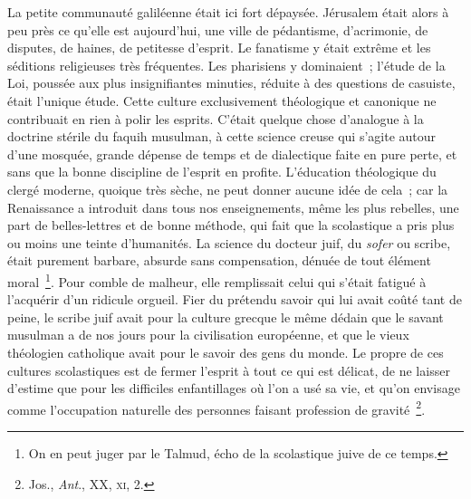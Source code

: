 \documentclass[french,twoside]{book} %
\begin{document}
La petite communauté galiléenne était ici fort dépaysée. Jérusalem était alors à peu près ce qu’elle est aujourd’hui, une ville de pédantisme, d’acrimonie, de disputes, de haines, de petitesse d’esprit. Le fanatisme y était extrême et les séditions religieuses très fréquentes. Les pharisiens y dominaient ; l’étude de la Loi, poussée aux plus insignifiantes minuties, réduite à des questions de casuiste, était l’unique étude. Cette culture exclusivement théologique et canonique ne contribuait en rien à polir les esprits. C’était quelque chose d’analogue à la doctrine stérile du faquih musulman, à cette science creuse qui s’agite autour d’une mosquée, grande dépense de temps et de dialectique faite en pure perte, et sans que la bonne discipline de l’esprit en profite. L’éducation théologique du clergé moderne, quoique très sèche, ne peut donner aucune idée de cela ; car la Renaissance a introduit dans tous nos enseignements, même les plus rebelles, une part de belles-lettres et de bonne méthode, qui fait que la scolastique a pris plus ou moins une teinte d’humanités. La science du docteur juif, du {\itshape sofer} ou scribe, était purement barbare, absurde sans compensation, dénuée de tout élément moral \footnote{On en peut juger par le Talmud, écho de la scolastique juive de ce temps.}. Pour comble de malheur, elle remplissait celui qui s’était fatigué à l’acquérir d’un ridicule orgueil. Fier du prétendu savoir qui lui avait coûté tant de peine, le scribe juif avait pour la culture grecque le même dédain que le savant musulman a de nos jours pour la civilisation européenne, et que le vieux théologien catholique avait pour le savoir des gens du monde. Le propre de ces cultures scolastiques est de fermer l’esprit à tout ce qui est délicat, de ne laisser d’estime que pour les difficiles enfantillages où l’on a usé sa vie, et qu’on envisage comme l’occupation naturelle des personnes faisant profession de gravité \footnote{ Jos., {\itshape Ant}., XX, \textsc{xi}, 2.}.\par
\end{document}
